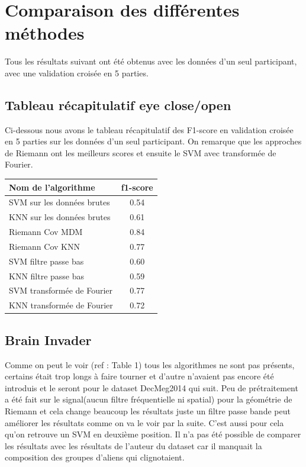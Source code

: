 \documentclass{article}[12pt]
\begin{document}
\section{Comparaison des différentes méthodes}
Tous les résultats suivant ont été obtenus avec les données d'un seul participant, avec une validation croisée en 5 parties.
\subsection{Tableau récapitulatif eye close/open}
Ci-dessous nous avons le tableau récapitulatif des F1-score en validation croisée en 5 parties sur les données d'un seul participant. On remarque que les approches de Riemann ont les meilleurs scores et ensuite le SVM avec transformée de Fourier.\\
\begin{center}
\begin{tabular}{|l|c|}
  \hline
  Nom de l'algorithme & f1-score\\
  \hline
  SVM sur les données brutes & 0.54 \\
  KNN sur les données brutes & 0.61\\
  Riemann Cov MDM  & 0.84 \\
  Riemann Cov KNN & 0.77\\
  SVM filtre passe bas & 0.60 \\
  KNN filtre passe bas & 0.59 \\
  SVM transformée de Fourier & 0.77 \\
  KNN transformée de Fourier & 0.72 \\
  \hline
\end{tabular}
\end{center}
\subsection{Brain Invader}
Comme on peut le voir (ref : Table 1) tous les algorithmes ne sont pas présents, certains était trop longs à faire tourner et d'autre n'avaient pas encore été introduis et le seront pour le dataset DecMeg2014 qui suit. Peu de  prétraitement a été fait sur le signal(aucun filtre fréquentielle ni spatial) pour la géométrie de Riemann et cela change beaucoup les résultats juste un filtre passe bande peut améliorer les résultats comme on va le voir par la suite. C'est aussi pour cela qu'on retrouve un SVM en deuxième position. Il n'a pas été possible de comparer les résultats avec les résultats de l'auteur du dataset car il manquait la composition des groupes d'aliens qui clignotaient.\\
\end{document}
